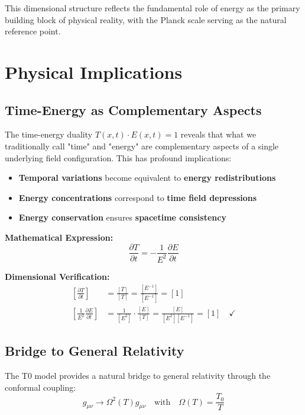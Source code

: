 \documentclass[12pt,a4paper]{report}
\begin{document}
	This dimensional structure reflects the fundamental role of energy as the primary building block of physical reality, with the Planck scale serving as the natural reference point.
	
	\section{Physical Implications}\label{sec:physical_implications}
	
	\subsection{Time-Energy as Complementary Aspects}\label{subsec:complementary_aspects}
	
	The time-energy duality $T(x,t) \cdot E(x,t) = 1$ reveals that what we traditionally call "time" and "energy" are complementary aspects of a single underlying field configuration. This has profound implications:
	
	\begin{itemize}
		\item \textbf{Temporal variations} become equivalent to \textbf{energy redistributions}
		\item \textbf{Energy concentrations} correspond to \textbf{time field depressions}
		\item \textbf{Energy conservation} ensures \textbf{spacetime consistency}
	\end{itemize}
	
	\textbf{Mathematical Expression:}
	\begin{equation}
		\frac{\partial T}{\partial t} = -\frac{1}{E^2}\frac{\partial E}{\partial t}
	\end{equation}
	
	\textbf{Dimensional Verification:}
	\begin{align}
		\left[\frac{\partial T}{\partial t}\right] &= \frac{[T]}{[T]} = \frac{[E^{-1}]}{[E^{-1}]} = [1] \\
		\left[\frac{1}{E^2}\frac{\partial E}{\partial t}\right] &= \frac{1}{[E^2]} \cdot \frac{[E]}{[T]} = \frac{[E]}{[E^2][E^{-1}]} = [1] \quad \checkmark
	\end{align}
	
	\subsection{Bridge to General Relativity}\label{subsec:bridge_general_relativity}
	
	The T0 model provides a natural bridge to general relativity through the conformal coupling:
	\begin{equation}
		g_{\mu\nu} \to \Omega^2(T) g_{\mu\nu} \quad \text{with} \quad \Omega(T) = \frac{T_0}{T}
		\label{eq:conformal_coupling}
	\end{equation}
	
\end{document}
